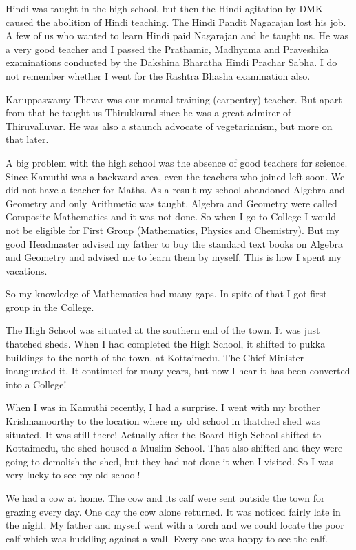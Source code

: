 Hindi was taught in the high school, but then the Hindi agitation by DMK 
caused the abolition of Hindi teaching. The Hindi Pandit Nagarajan lost 
his job. A few of us who wanted to learn Hindi paid Nagarajan and he 
taught us. He was a very good teacher and I passed the Prathamic, 
Madhyama and Praveshika examinations conducted by the Dakshina Bharatha 
Hindi Prachar Sabha. I do not remember whether I went for the Rashtra 
Bhasha examination also.

Karuppaswamy Thevar was our manual training (carpentry) teacher. But 
apart from that he taught us Thirukkural since he was a great admirer of 
Thiruvalluvar. He was also a staunch advocate of vegetarianism, but more 
on that later.
 
A big problem with the high school was the absence of good teachers for 
science. Since Kamuthi was a backward area, even the teachers who joined 
left soon. We did not have a teacher for Maths. As a result my school 
abandoned Algebra and Geometry and only Arithmetic was taught. Algebra 
and Geometry were called Composite Mathematics and it was not done. So 
when I go to College I would not be eligible for First Group 
(Mathematics, Physics and Chemistry). But my good Headmaster advised my 
father to buy the standard text books on Algebra and Geometry and 
advised me to learn them by myself. This is how I spent my vacations.

So my knowledge of Mathematics had many gaps. In spite of that I got 
first group in the College.

The High School was situated at the southern end of the town. It was 
just thatched sheds. When I had completed the High School, it shifted to 
pukka buildings to the north of the town, at Kottaimedu. The Chief 
Minister inaugurated it. It conti\-nued for many years, but now I hear it 
has been converted into a Colleg\-e!

When I was in Kamuthi recently, I had a surprise. I went with my brother 
Krishnamoorthy to the location where my old school in thatched shed was 
situated. It was still there! Actually after the Board High School 
shifted to Kottaimedu, the shed housed a Muslim School. That also 
shifted and they were going to demolish the shed, but they had not done 
it when I visited. So I was very lucky to see my old school!

We had a cow at home. The cow and its calf were sent outside the town 
for grazing every day. One day the cow alone returned. It was noticed 
fairly late in the night. My father and myself went with a torch and we 
could locate the poor calf which was huddling against a wall. Every one 
was happy to see the calf.

